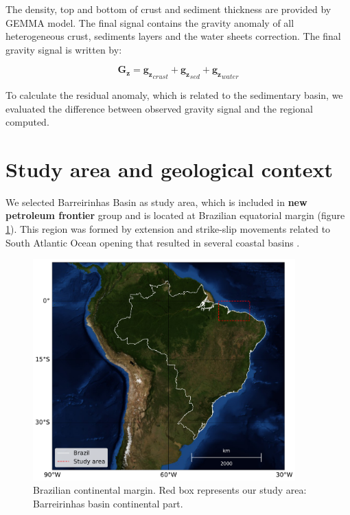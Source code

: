 \documentclass{sciposter}
\begin{document}
\begin{multicols}{3}
	The density, top and bottom of crust and sediment thickness are  provided by GEMMA model. The final signal contains the gravity anomaly of all heterogeneous crust, sediments layers and the water sheets correction. The final gravity signal is written by:
	\begin{small}
		$$
		\mathbf{G_z} = 
		\mathbf{g_z}_{crust} + 
		\mathbf{g_z}_{sed} + 
		\mathbf{g_z}_{water}
		$$
	\end{small}
	To calculate the residual anomaly, which is related to the sedimentary basin, we evaluated the difference between observed gravity signal and the regional computed.
	
	\section*{\large Study area and geological context}
	We selected Barreirinhas Basin as study area, which is included in \textbf{new petroleum frontier} group and is located at Brazilian equatorial margin (figure \ref{fig0}). This region was formed by extension and strike-slip movements related to South Atlantic Ocean opening that resulted in several coastal basins \cite{almeida2009quaternary,soaresjunior2008evolucao}.
	
	\begin{figure}
		\begin{center}
			\includegraphics[width=0.9\textwidth]{figures/figure01a-location.pdf}
		\end{center}
		\caption{Brazilian continental margin. Red box represents our study area: Barreirinhas basin continental part.}
		\label{fig0}
	\end{figure}
	

\end{multicols}
\end{document}
